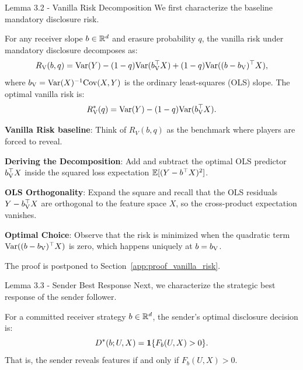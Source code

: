 \begin{faqblock}
\faqanswers
{}
\end{faqblock}

\begin{sourceblock}{Lemma 3.2 - Vanilla Risk Decomposition}
We first characterize the baseline mandatory disclosure risk.
\begin{lemma}
\label{lem:vanilla_risk}
For any receiver slope $b \in \mathbb{R}^d$ and erasure probability $q$, the vanilla risk under mandatory disclosure decomposes as:
\begin{equation}
    \label{eq:vanilla_risk_decomp}
    R_{\mathrm{V}}(b, q) = \mathrm{Var}(Y) - (1 - q)\mathrm{Var}(b_{\mathrm{V}}^\top X) + (1 - q)\mathrm{Var}((b - b_{\mathrm{V}})^\top X),
\end{equation}
where $b_{\mathrm{V}} = \mathrm{Var}(X)^{-1}\mathrm{Cov}(X, Y)$ is the ordinary least-squares (OLS) slope. The optimal vanilla risk is:
\begin{equation}
    \label{eq:opt_vanilla_risk}
    R_{\mathrm{V}}^*(q) = \mathrm{Var}(Y) - (1 - q)\mathrm{Var}(b_{\mathrm{V}}^\top X).
\end{equation}
\end{lemma}
\end{sourceblock}

\begin{guideblock}
\item \textbf{Vanilla Risk baseline}: Think of $R_V(b, q)$ as the benchmark where players are forced to reveal.
\item \textbf{Deriving the Decomposition}: Add and subtract the optimal OLS predictor $b_{\mathrm{V}}^\top X$ inside the squared loss expectation $\mathbb{E}[(Y - b^\top X)^2]$.
\item \textbf{OLS Orthogonality}: Expand the square and recall that the OLS residuals $Y - b_{\mathrm{V}}^\top X$ are orthogonal to the feature space $X$, so the cross-product expectation vanishes.
\item \textbf{Optimal Choice}: Observe that the risk is minimized when the quadratic term $\mathrm{Var}((b - b_{\mathrm{V}})^\top X)$ is zero, which happens uniquely at $b = b_{\mathrm{V}}$.
\end{guideblock}
The proof is postponed to Section~\ref{app:proof_vanilla_risk}.

\begin{sourceblock}{Lemma 3.3 - Sender Best Response}
Next, we characterize the strategic best response of the sender follower.
\begin{lemma}
\label{lem:best_response}
For a committed receiver strategy $b \in \mathbb{R}^d$, the sender's optimal disclosure decision is:
\begin{equation}
    \label{eq:best_response_indicator}
    D^*(b; U, X) = \mathbf{1}\{F_b(U, X) > 0\}.
\end{equation}
That is, the sender reveals features if and only if $F_b(U, X) > 0$.
\end{lemma}
\end{sourceblock}

